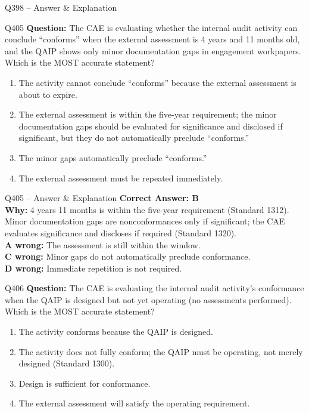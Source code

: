 \documentclass[aspectratio=169,10pt]{beamer}
\begin{document}
\begin{frame}[t]{Q398 -- Answer \& Explanation}
	\begin{frame}[t]{Q405}
		\small
		\textbf{Question:} The CAE is evaluating whether the internal audit activity can conclude ``conforms'' when the external assessment is 4 years and 11 months old, and the QAIP shows only minor documentation gaps in engagement workpapers. Which is the MOST accurate statement?
		\begin{enumerate}[label=\Alph*.,itemsep=1pt,topsep=2pt]
			\item The activity cannot conclude ``conforms'' because the external assessment is about to expire.
			\item The external assessment is within the five-year requirement; the minor documentation gaps should be evaluated for significance and disclosed if significant, but they do not automatically preclude ``conforms.''
			\item The minor gaps automatically preclude ``conforms.''
			\item The external assessment must be repeated immediately.
		\end{enumerate}
	\end{frame}
	
	\begin{frame}[t]{Q405 -- Answer \& Explanation}
		\small
		\textbf{Correct Answer: B} \\[4pt]
		\textbf{Why:} 4 years 11 months is within the five-year requirement (Standard 1312). Minor documentation gaps are nonconformances only if significant; the CAE evaluates significance and discloses if required (Standard 1320). \\[4pt]
		\textbf{A wrong:} The assessment is still within the window. \\[2pt]
		\textbf{C wrong:} Minor gaps do not automatically preclude conformance. \\[2pt]
		\textbf{D wrong:} Immediate repetition is not required.
	\end{frame}
	
	\begin{frame}[t]{Q406}
		\small
		\textbf{Question:} The CAE is evaluating the internal audit activity's conformance when the QAIP is designed but not yet operating (no assessments performed). Which is the MOST accurate statement?
		\begin{enumerate}[label=\Alph*.,itemsep=1pt,topsep=2pt]
			\item The activity conforms because the QAIP is designed.
			\item The activity does not fully conform; the QAIP must be operating, not merely designed (Standard 1300).
			\item Design is sufficient for conformance.
			\item The external assessment will satisfy the operating requirement.
		\end{enumerate}
	\end{frame}
	

\end{frame}
\end{document}
